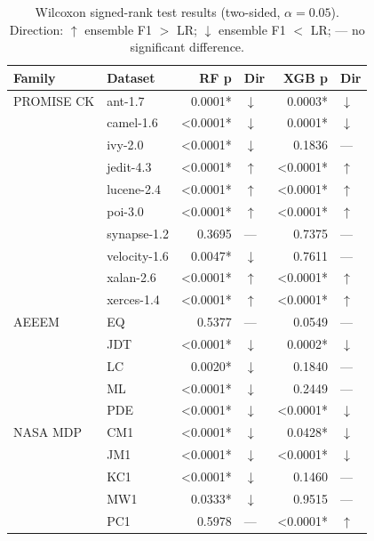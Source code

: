 \documentclass[10pt, a4paper]{article}
\begin{document}
\begin{table}[h]
\centering
\footnotesize
\begin{tabular}{l l r l r l}
\toprule
\textbf{Family} & \textbf{Dataset} & \textbf{RF p} & \textbf{Dir} & \textbf{XGB p} & \textbf{Dir} \\
\midrule
PROMISE CK & ant-1.7      & 0.0001* & $\downarrow$ & 0.0003* & $\downarrow$ \\
           & camel-1.6    & <0.0001* & $\downarrow$ & 0.0001* & $\downarrow$ \\
           & ivy-2.0      & <0.0001* & $\downarrow$ & 0.1836  & --- \\
           & jedit-4.3    & <0.0001* & $\uparrow$   & <0.0001* & $\uparrow$ \\
           & lucene-2.4   & <0.0001* & $\uparrow$   & <0.0001* & $\uparrow$ \\
           & poi-3.0      & <0.0001* & $\uparrow$   & <0.0001* & $\uparrow$ \\
           & synapse-1.2  & 0.3695  & ---           & 0.7375  & --- \\
           & velocity-1.6 & 0.0047* & $\downarrow$ & 0.7611  & --- \\
           & xalan-2.6    & <0.0001* & $\uparrow$   & <0.0001* & $\uparrow$ \\
           & xerces-1.4   & <0.0001* & $\uparrow$   & <0.0001* & $\uparrow$ \\
\midrule
AEEEM      & EQ           & 0.5377  & ---           & 0.0549  & --- \\
           & JDT          & <0.0001* & $\downarrow$ & 0.0002* & $\downarrow$ \\
           & LC           & 0.0020* & $\downarrow$  & 0.1840  & --- \\
           & ML           & <0.0001* & $\downarrow$ & 0.2449  & --- \\
           & PDE          & <0.0001* & $\downarrow$ & <0.0001* & $\downarrow$ \\
\midrule
NASA MDP   & CM1          & <0.0001* & $\downarrow$ & 0.0428* & $\downarrow$ \\
           & JM1          & <0.0001* & $\downarrow$ & <0.0001* & $\downarrow$ \\
           & KC1          & <0.0001* & $\downarrow$ & 0.1460  & --- \\
           & MW1          & 0.0333* & $\downarrow$  & 0.9515  & --- \\
           & PC1          & 0.5978  & ---           & <0.0001* & $\uparrow$ \\
\bottomrule
\end{tabular}
\caption{Wilcoxon signed-rank test results (two-sided, $\alpha = 0.05$). Direction: $\uparrow$ ensemble F1 $>$ LR; $\downarrow$ ensemble F1 $<$ LR; --- no significant difference.}
\end{table}
\end{document}
